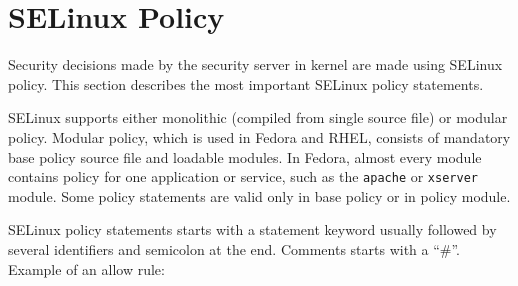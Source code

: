 \section{SELinux Policy}
\label{policy}
Security decisions made by the security server in kernel are made using
SELinux policy. This section describes the most important SELinux policy
statements.

SELinux supports either monolithic (compiled from single source file) or modular
policy. Modular policy, which is used in Fedora and RHEL, consists of mandatory
base policy source file and loadable modules. In Fedora, almost every module
contains policy for one application or service, such as the \texttt{apache} or
\texttt{xserver} module. Some policy statements are valid only in base policy or
in policy module.

SELinux policy statements starts with a statement keyword usually followed by
several identifiers and semicolon at the end. Comments starts with a ``\#''.
Example of an allow rule:

